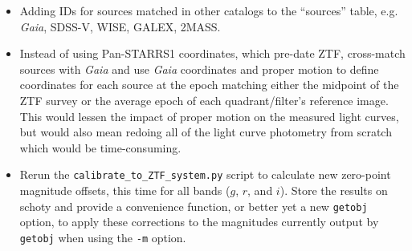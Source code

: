 \documentclass[12pt]{article}
\begin{document}
\begin{itemize}
    \item Adding IDs for sources matched in other catalogs to the ``sources'' table, e.g. {\em Gaia}, SDSS-V, WISE, GALEX, 2MASS.
    \item Instead of using Pan-STARRS1 coordinates, which pre-date ZTF, cross-match sources with {\em Gaia} and use {\em Gaia} coordinates and proper motion to define coordinates for each source at the epoch matching either the midpoint of the ZTF survey or the average epoch of each quadrant/filter's reference image. This would lessen the impact of proper motion on the measured light curves, but would also mean redoing all of the light curve photometry from scratch which would be time-consuming.

    \item Rerun the {\tt calibrate\_to\_ZTF\_system.py} script to calculate new zero-point magnitude offsets, this time for all bands ($g$, $r$, and $i$). Store the results on schoty and provide a convenience function, or better yet a new {\tt getobj} option, to apply these corrections to the magnitudes currently output by {\tt getobj} when using the {\tt -m} option.
\end{itemize}
\end{document}
